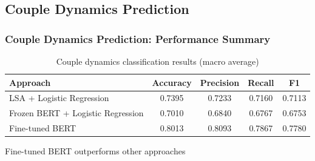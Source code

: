 \documentclass[aspectratio=169,xcolor=dvipsnames]{beamer}
\begin{document}
\subsection{Couple Dynamics Prediction}

\begin{frame}
\frametitle{Couple Dynamics Prediction: Performance Summary}

\begin{table}
\centering
\begin{tabular}{lcccc}
\toprule
\textbf{Approach} & \textbf{Accuracy} & \textbf{Precision} & \textbf{Recall} & \textbf{F1} \\
\midrule
LSA + Logistic Regression & 0.7395 & 0.7233 & 0.7160 & 0.7113 \\
Frozen BERT + Logistic Regression & 0.7010 & 0.6840 & 0.6767 & 0.6753 \\
Fine-tuned BERT & 0.8013 & 0.8093 & 0.7867 & 0.7780 \\
\bottomrule
\end{tabular}
\caption{Couple dynamics classification results (macro average)}
\end{table}

\vspace{0.2cm}
\begin{center}
\colorbox{blue!10}{\parbox{0.75\linewidth}{\centering Fine-tuned BERT outperforms other approaches}}
\end{center}

\end{frame}
\end{document}
